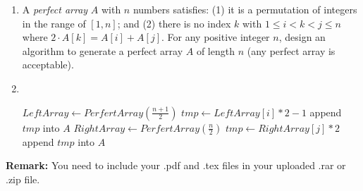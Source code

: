 \documentclass[12pt,a4paper]{article}
\makeatletter
\newtheorem*{solution}{Solution}
\theoremstyle{definition}
\renewenvironment{solution}[1][Solution] {\par\pushQED{\qed}\normalfont\topsep6\p@\@plus6\p@\relax\trivlist\item[\hskip\labelsep\bfseries#1\@addpunct{.}]\ignorespaces}{\popQED\endtrivlist\@endpefalse} \makeatother
\makeatother
\begin{document}
\begin{enumerate}
    \item
    A \emph{perfect array} $A$ with $n$ numbers satisfies: (1) it is a permutation of integers in the range of $[1,n]$; and (2) there is no index $k$ with $1\le i < k < j \leq n $ where $2 \cdot A[k] = A[i] + A[j]$. For any positive integer $n$, design an algorithm to generate a perfect array $A$ of length $n$ (any perfect array is acceptable).
    \begin{solution}
        \quad \\
        \begin{algorithm}[H]
        	\BlankLine
        	\caption{$PerfectArray(n)$} \label{Alg-div}
        	{
        		\Return{[1]} \;
        	}
        	\Else
        	{
        		$LeftArray\leftarrow PerfertArray(\frac{n+1}{2})$ \;
        		{
        			$tmp\leftarrow LeftArray[i]*2-1$ \;
        			append $tmp$ into $A$ \;
        		}
        		$RightArray\leftarrow PerfertArray(\frac{n}{2})$ \;
        		{
        			$tmp\leftarrow RightArray[j]*2$ \;
        			append $tmp$ into $A$ \;
        		}
        	}
        	\;
        \end{algorithm}
    \end{solution}

\end{enumerate}

\vspace{20pt}

\textbf{Remark:} You need to include your .pdf and .tex files in your uploaded .rar or .zip file.

\end{document}
